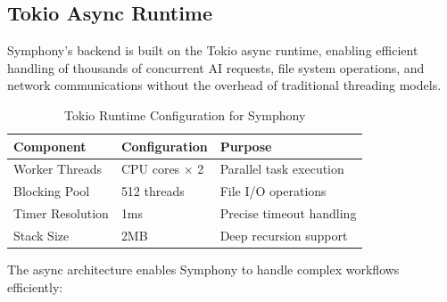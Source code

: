 \subsection*{Tokio Async Runtime}

Symphony's backend is built on the Tokio async runtime, enabling efficient handling of thousands of concurrent AI requests, file system operations, and network communications without the overhead of traditional threading models.

\begin{table}[h]
\centering
\caption{Tokio Runtime Configuration for Symphony}
\begin{tabular}{@{}lll@{}}
\toprule
\textbf{Component} & \textbf{Configuration} & \textbf{Purpose} \\
\midrule
Worker Threads & CPU cores × 2 & Parallel task execution \\
Blocking Pool & 512 threads & File I/O operations \\
Timer Resolution & 1ms & Precise timeout handling \\
Stack Size & 2MB & Deep recursion support \\
\bottomrule
\end{tabular}
\end{table}

The async architecture enables Symphony to handle complex workflows efficiently:

